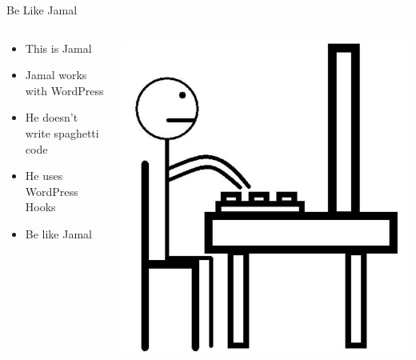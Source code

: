 \documentclass[10pt]{beamer}
\begin{document}
    \begin{frame}{Be Like Jamal}
        \begin{columns}
            \begin{column}{0.5\textwidth}
                \begin{itemize}
                    \item[] This is Jamal
                    \item[] Jamal works with WordPress
                    \item[] He doesn't write spaghetti code
                    \item[] He uses WordPress Hooks
                    \item[] Be like Jamal
                \end{itemize}
            \end{column}
            \begin{column}{0.5\textwidth}
                \begin{center}
                    \includegraphics[width=1\textwidth]{images/jamal}
                \end{center}
            \end{column}
        \end{columns}
    \end{frame}
\end{document}
